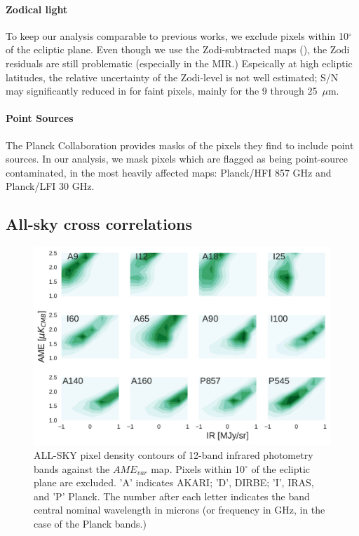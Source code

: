       \paragraph{Zodical light}
        To keep our analysis comparable to previous works, we exclude pixels within 10$^{\circ}$ of the ecliptic plane. Even though we use the Zodi-subtracted maps (\citep{kelsall98, kondo16}), the Zodi residuals are still problematic (especially in the MIR.) Espeically at high ecliptic latitudes, the relative uncertainty of the Zodi-level is not well estimated; S/N may significantly reduced in for faint pixels, mainly for the 9 through 25~$\mu$m.

     \paragraph{Point Sources}
       The Planck Collaboration provides masks of the pixels they find to include point sources. In our analysis, we mask pixels which are flagged as being point-source contaminated, in the most heavily affected maps: Planck/HFI 857 GHz and Planck/LFI 30 GHz.


  \subsection{All-sky cross correlations}

        \begin{figure}

          \includegraphics[width=\textwidth]{../Plots/AMEvsDust_allsky_allbands.pdf}
          \centering
          \caption{ALL-SKY pixel density contours of 12-band infrared photometry bands against the $AME_{var}$ map. Pixels within 10$^{\circ}$ of the ecliptic plane are excluded. 'A' indicates AKARI; 'D', DIRBE; 'I', IRAS, and 'P' Planck. The number after each letter indicates the band central nominal wavelength in microns (or frequency in GHz, in the case of the Planck bands.) }
          \label{fig:AMEvsDust_allsky_allbands}
        \end{figure}

